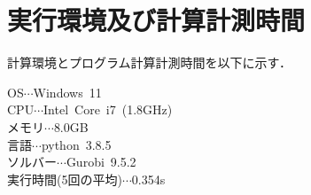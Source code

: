 \documentclass[12pt,fleqn]{jreport}
\begin{document}
\section{実行環境及び計算計測時間}
\vspace{1cm}
計算環境とプログラム計算計測時間を以下に示す．
\begin{center}
  \begin{multicols}{2}
    \begin{description}
      \item[OS$\cdots$Windows\ 11]
      \item[CPU$\cdots$Intel\ Core\ i7\ (1.8GHz)]
      \item[メモリ$\cdots$8.0GB]
      \item[言語$\cdots$python\ 3.8.5]
      \item[ソルバー$\cdots$Gurobi\ 9.5.2]
      \item[ 実行時間(5回の平均)$\cdots$0.354s]
    \end{description}
  \end{multicols}
\end{center}
\newpage
\end{document}
